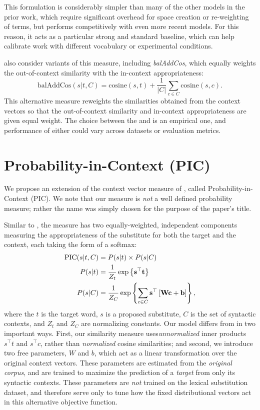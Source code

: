 This formulation is considerably simpler than many of the other models
in the prior work, which require significant overhead for space creation
or re-weighting of terms, but performs competitively with even more recent
models. For this reason, it acts as a particular strong and standard baseline,
which can help calibrate work with different vocabulary or experimental
conditions.

 also consider variants of this measure, including
{\em balAddCos}, which equally weights the out-of-context similarity with the
in-context appropriateness:
\begin{equation}
  \text{balAddCos}(s|t,C) = \text{cosine}(s, t) + \frac{1}{|C|}\sum_{c\in C} \text{cosine}(s, c).
\end{equation}
This alternative measure reweights the similarities obtained from the context
vectors so that the out-of-context similarity and in-context appropriateness
are given equal weight. The choice between the \addCos and \balAddCos is
an empirical one, and performance of either could vary across datasets or
evaluation metrics.

\section{Probability-in-Context (PIC)}

We propose an extension of the context vector measure of
, called Probability-in-Context (PIC).  We note that
our measure is {\em not} a well defined probability measure; rather the name was
simply chosen for the purpose of the paper's title.

Similar to \balAddCos, the measure has two equally-weighted, independent
components measuring the appropriateness of the substitute for both the target
and the context, each taking the form of a softmax:
\begin{equation}
  \begin{aligned}
  \mbox{PIC}(s | t, C) &= P(s | t) \times P(s | C)\\
  P(s | t) &= \frac{1}{Z_t}\exp\left\{{\mathbf{s}}^\top {\mathbf{t}}\right\}\\
  P(s | C) &= \frac{1}{Z_C}\exp\left\{\sum_{c\in C}{\mathbf{s}}^\top\left[{{\mathbf{W}}}{\mathbf{c}} + {\mathbf{b}}\right]\right\},
  \end{aligned}
  \label{eqn:pic}
\end{equation}
where the $t$ is the target word, $s$ is a proposed substitute, $C$ is the set
of syntactic contexts, and $Z_t$ and $Z_C$ are normalizing constants. Our
model differs from \mbox{\balAddCos} in two important ways. First, our
similarity measure uses{\em unnormalized} inner products $s^\top t$
and $s^\top c$, rather than {\em normalized} cosine similarities; and
second, we introduce two  free parameters, $W$ and $b$, which act as a linear
transformation over the original context vectors. These parameters are
estimated from the {\em original corpus}, and are trained to maximize the
prediction of a {\em target} from only its syntactic contexts. These parameters
are {\em not} trained on the lexical substitution dataset, and
therefore serve only to tune how the fixed distributional vectors act in this
alternative objective function.

